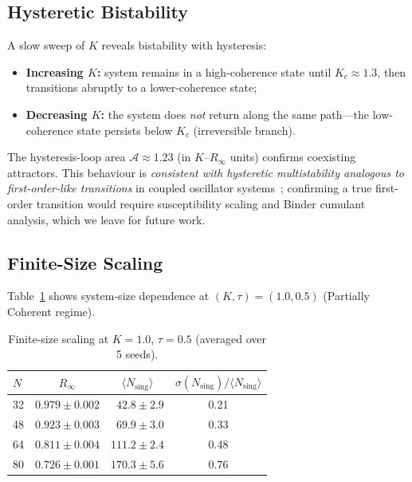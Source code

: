 \documentclass[11pt,a4paper]{article}
\begin{document}
\subsection{Hysteretic Bistability}

A slow sweep of $K$ reveals bistability with hysteresis:
\begin{itemize}
    \item \textbf{Increasing $K$:} system remains in a
          high-coherence state until $K_c \approx 1.3$,
          then transitions abruptly to a lower-coherence state;
    \item \textbf{Decreasing $K$:} the system does \emph{not}
          return along the same path---the low-coherence state
          persists below $K_c$ (irreversible branch).
\end{itemize}
The hysteresis-loop area $\mathcal{A} \approx 1.23$ (in
$K$--$R_\infty$ units) confirms coexisting attractors.
This behaviour is \textit{consistent with hysteretic
multistability analogous to first-order-like transitions}
in coupled oscillator systems~\cite{Strogatz2000,Ott2008};
confirming a true first-order transition would require
susceptibility scaling and Binder cumulant analysis, which
we leave for future work.

\subsection{Finite-Size Scaling}

Table~\ref{tab:finitesize} shows system-size dependence at
$(K,\tau) = (1.0, 0.5)$ (Partially Coherent regime).

\begin{table}[htbp]
\centering
\caption{%
  Finite-size scaling at $K=1.0$, $\tau=0.5$
  (averaged over 5 seeds).%
}
\label{tab:finitesize}
\begin{tabular}{@{}lccc@{}}
\toprule
$N$ & $R_\infty$ &
  $\langle N_{\text{sing}}\rangle$ &
  $\sigma(N_{\text{sing}})/\langle N_{\text{sing}}\rangle$ \\
\midrule
32 & $0.979 \pm 0.002$ & $\phantom{0}42.8 \pm 2.9$ & 0.21 \\
48 & $0.923 \pm 0.003$ & $\phantom{0}69.9 \pm 3.0$ & 0.33 \\
64 & $0.811 \pm 0.004$ & $111.2 \pm 2.4$ & 0.48 \\
80 & $0.726 \pm 0.001$ & $170.3 \pm 5.6$ & 0.76 \\
\bottomrule
\end{tabular}
\end{table}
\end{document}
